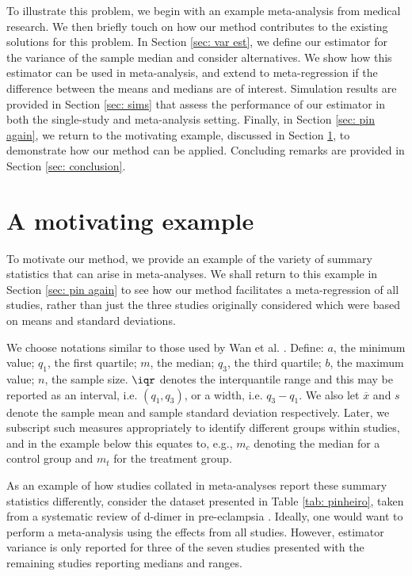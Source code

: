 \documentclass{article}
\begin{document}
To illustrate this problem, we begin with an example meta-analysis from medical research. We then briefly touch on how our method contributes to the existing solutions for this problem. In Section \ref{sec: var est}, we define our estimator for the variance of the sample median and consider alternatives. We show how this estimator can be used in meta-analysis, and extend to meta-regression if the difference between the means and medians are of interest. Simulation results are provided in Section \ref{sec: sims} that assess the performance of our estimator in both the single-study and meta-analysis setting.   Finally, in Section \ref{sec: pin again}, we return to the motivating example, discussed in Section \ref{sec: motiv}, to demonstrate how our method can be applied. Concluding remarks are provided in Section \ref{sec: conclusion}.

\section{A motivating example}
\label{sec: motiv}

To motivate our method, we provide an example of the variety of summary statistics that can arise in meta-analyses. We shall return to this example in Section \ref{sec: pin again} to see how our method facilitates a meta-regression of all studies, rather than just the three studies originally considered which were based on means and standard deviations.

We choose notations similar to those used by Wan et al. \cite{Wan2014}.  Define:
$a$, the minimum value;
$q_1$, the first quartile;
$m$, the median;
$q_3$, the third quartile;
$b$, the maximum value;
$n$, the sample size.  $\iqr$ denotes the interquantile range and this may be reported as an interval, i.e. $(q_1,q_3)$, or a width, i.e. $q_3-q_1$. We also let $\overline{x}$ and $s$ denote the sample mean and sample standard deviation respectively.  Later, we subscript such measures appropriately to identify different groups within studies, and in the example below this equates to, e.g., $m_c$ denoting the median for a control group and $m_t$ for the treatment group.

As an example of how studies collated in meta-analyses report these summary statistics differently, consider the dataset presented in Table \ref{tab: pinheiro}, taken from a systematic review of d-dimer in pre-eclampsia \cite{Pinheiro2012}. Ideally, one would want to perform a meta-analysis using the effects from all studies. However, estimator variance is only reported for three of the seven studies presented with the remaining studies reporting medians and ranges.
\end{document}
